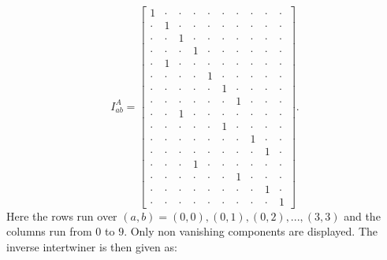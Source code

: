 \documentclass[a4paper,12pt, DIV=14, BCOR=5mm, twoside, headsepline, numbers=noenddot]{scrbook}
\begin{document}
\begin{equation}\label{interIMet}
I^A_{ab} = \begin{bmatrix}
                1 & \cdot & \cdot & \cdot & \cdot & \cdot & \cdot & \cdot & \cdot & \cdot \\
                \cdot & 1 & \cdot & \cdot & \cdot & \cdot & \cdot & \cdot & \cdot & \cdot \\
                \cdot & \cdot & 1 & \cdot & \cdot & \cdot & \cdot & \cdot & \cdot & \cdot \\
                \cdot & \cdot & \cdot & 1 & \cdot & \cdot & \cdot & \cdot & \cdot & \cdot \\
                \cdot & 1 & \cdot & \cdot & \cdot & \cdot & \cdot & \cdot & \cdot & \cdot \\
                \cdot & \cdot & \cdot & \cdot & 1 & \cdot & \cdot & \cdot & \cdot & \cdot \\
                \cdot & \cdot & \cdot & \cdot & \cdot & 1 & \cdot & \cdot & \cdot & \cdot \\
                \cdot & \cdot & \cdot & \cdot & \cdot & \cdot & 1 & \cdot & \cdot & \cdot \\
                \cdot & \cdot & 1 & \cdot & \cdot & \cdot & \cdot & \cdot & \cdot & \cdot  \\
                \cdot & \cdot & \cdot & \cdot & \cdot & 1 & \cdot & \cdot & \cdot & \cdot  \\
                \cdot & \cdot & \cdot & \cdot & \cdot & \cdot & \cdot & 1 & \cdot & \cdot\\
                \cdot & \cdot & \cdot & \cdot & \cdot & \cdot & \cdot & \cdot & 1 & \cdot \\
                \cdot & \cdot & \cdot & 1 & \cdot & \cdot & \cdot & \cdot & \cdot & \cdot \\
                \cdot & \cdot & \cdot & \cdot & \cdot & \cdot & 1 & \cdot & \cdot & \cdot \\
                \cdot & \cdot & \cdot & \cdot & \cdot & \cdot & \cdot & \cdot & 1 & \cdot \\
                \cdot & \cdot & \cdot & \cdot & \cdot & \cdot & \cdot & \cdot & \cdot & 1 
            \end{bmatrix}.
\end{equation}
Here the rows run over $(a,b)={(0,0),(0,1),(0,2),...,(3,3)}$ and the columns run from $0$ to $9$. Only non vanishing components are displayed. The inverse intertwiner is then given as: 
\end{document}
